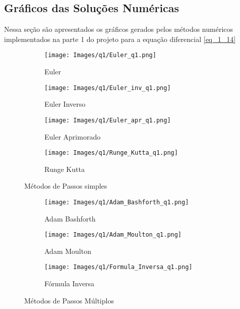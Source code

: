 \documentclass[12pt]{article}
\begin{document}
\newpage


\subsection{Gráficos das Soluções Numéricas}
Nessa seção são apresentados os gráficos gerados pelos métodos numéricos implementados na parte 1 do projeto para a equação diferencial \ref{eq_1_14}

\begin{figure}[H]
\begin{subfigure}{.5\textwidth}
  \centering
  \texttt{[image: Images/q1/Euler\_q1.png]}  
  \caption{Euler}
\end{subfigure}
\begin{subfigure}{.5\textwidth}
  \centering
  \texttt{[image: Images/q1/Euler\_inv\_q1.png]}  
  \caption{Euler Inverso}
\end{subfigure}

\newline

\begin{subfigure}{.5\textwidth}
  \centering
  \texttt{[image: Images/q1/Euler\_apr\_q1.png]}  
  \caption{Euler Aprimorado}
\end{subfigure}
\begin{subfigure}{.5\textwidth}
  \centering
  \texttt{[image: Images/q1/Runge\_Kutta\_q1.png]}  
  \caption{Runge Kutta}
\end{subfigure}
\caption{Métodos de Passos simples}
\end{figure}

\begin{figure}[H]
\begin{subfigure}{.5\textwidth}
  \centering
  \texttt{[image: Images/q1/Adam\_Bashforth\_q1.png]}  
  \caption{Adam Bashforth}
\end{subfigure}
\begin{subfigure}{.5\textwidth}
  \centering
  \texttt{[image: Images/q1/Adam\_Moulton\_q1.png]}  
  \caption{Adam Moulton}
\end{subfigure}

\newline

\begin{subfigure}{.5\textwidth}
  \centering
  \texttt{[image: Images/q1/Formula\_Inversa\_q1.png]}  
  \caption{Fórmula Inversa}
\end{subfigure}
\caption{Métodos de Passos Múltiplos}
\end{figure}
\end{document}
